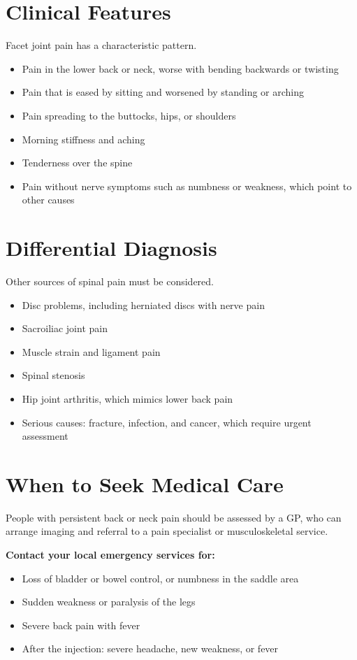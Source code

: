 \section*{Clinical Features}
Facet joint pain has a characteristic pattern.
\begin{itemize}
    \item Pain in the lower back or neck, worse with bending backwards or twisting
    \item Pain that is eased by sitting and worsened by standing or arching
    \item Pain spreading to the buttocks, hips, or shoulders
    \item Morning stiffness and aching
    \item Tenderness over the spine
    \item Pain without nerve symptoms such as numbness or weakness, which point to other causes
\end{itemize}

\section*{Differential Diagnosis}
Other sources of spinal pain must be considered.
\begin{itemize}
    \item Disc problems, including herniated discs with nerve pain
    \item Sacroiliac joint pain
    \item Muscle strain and ligament pain
    \item Spinal stenosis
    \item Hip joint arthritis, which mimics lower back pain
    \item Serious causes: fracture, infection, and cancer, which require urgent assessment
\end{itemize}

\section*{When to Seek Medical Care}
People with persistent back or neck pain should be assessed by a GP, who can arrange imaging and referral to a pain specialist or musculoskeletal service.

\textbf{Contact your local emergency services for:}
\begin{itemize}
    \item Loss of bladder or bowel control, or numbness in the saddle area
    \item Sudden weakness or paralysis of the legs
    \item Severe back pain with fever
    \item After the injection: severe headache, new weakness, or fever
\end{itemize}

